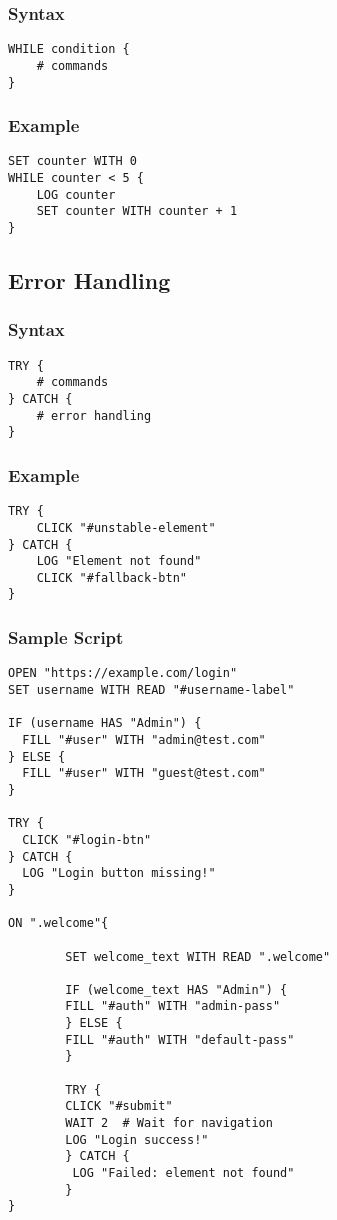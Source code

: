 \documentclass[11pt]{article}
\begin{document}
\subsubsection{Syntax}
\label{sec:org174c0ca}
\begin{verbatim}
WHILE condition {
    # commands
}
\end{verbatim}
\subsubsection{Example}
\label{sec:org89b4397}
\begin{verbatim}
SET counter WITH 0
WHILE counter < 5 {
    LOG counter
    SET counter WITH counter + 1
}
\end{verbatim}
\subsection{Error Handling}
\label{sec:org7b07f29}
\subsubsection{Syntax}
\label{sec:orgfd0d7d6}
\begin{verbatim}
TRY {
    # commands
} CATCH {
    # error handling
}
\end{verbatim}
\subsubsection{Example}
\label{sec:orgc7da632}
\begin{verbatim}
TRY {
    CLICK "#unstable-element"
} CATCH {
    LOG "Element not found"
    CLICK "#fallback-btn"
}
\end{verbatim}
\subsubsection{Sample Script}
\label{sec:org354660a}
\begin{verbatim}
OPEN "https://example.com/login"
SET username WITH READ "#username-label"

IF (username HAS "Admin") {
  FILL "#user" WITH "admin@test.com"
} ELSE {
  FILL "#user" WITH "guest@test.com"
}

TRY {
  CLICK "#login-btn"
} CATCH {
  LOG "Login button missing!"
}

ON ".welcome"{

        SET welcome_text WITH READ ".welcome"

        IF (welcome_text HAS "Admin") {
        FILL "#auth" WITH "admin-pass"
        } ELSE {
        FILL "#auth" WITH "default-pass"
        }

        TRY {
        CLICK "#submit"
        WAIT 2  # Wait for navigation
        LOG "Login success!"
        } CATCH {
         LOG "Failed: element not found"
        }
}
\end{verbatim}
\end{document}
